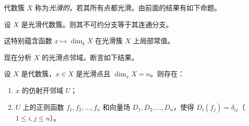 代数簇 $X$ 称为\emph{光滑的}，若其所有点都光滑。由前面的结果有如下命题。

\begin{proposition}
设 $X$ 是光滑代数簇。则其不可约分支等于其连通分支。
\end{proposition}

这特别蕴含函数 $x\longmapsto\dim_kX$ 在光滑簇 $X$ 上局部常值。

现在分析 $X$ 的光滑点邻域。断言如下结果。

\begin{theorem}
设 $X$ 是代数簇，$x\in X$ 是光滑点且 $\dim_xX=n$。则存在：
\begin{enumerate}[label=(\roman*)]
  \item $x$ 的仿射开邻域 $U$；
  \item $U$ 上的正则函数 $f_1,f_2,\dots,f_n$ 和向量场 $D_1,D_2,\dots,D_n$，使得 $D_i(f_j)=\delta_{ij}$（$1\le i,j\le n$）。
\end{enumerate}
\end{theorem}

